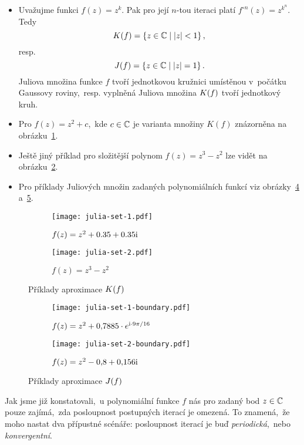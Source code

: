 \begin{example}
    \begin{itemize}
        \item Uvažujme funkci $f(z)=z^k$. Pak pro její $n$-tou iteraci platí $f^{\circ n}(z)=z^{k^n}$. Tedy
        \[K(f)=\left\{z\in\mathbb{C}\mid |z|<1\right\},\]
        resp.
        \[J(f)=\left\{z\in\mathbb{C}\mid|z|=1\right\}.\]
        Juliova množina funkce $f$ tvoří jednotkovou kružnici umístěnou v~počátku Gaussovy roviny,~resp. vyplněná Juliova množina $K(f)$ tvoří jednotkový kruh.
        \item Pro $f(z)=z^2+c$,~kde $c\in\mathbb{C}$ je varianta množiny $K(f)$ znázorněna na obrázku~\ref{subfig:vyplnena-juliova-mnozina-1}.
        \item Ještě jiný příklad pro složitější polynom $f(z)=z^3-z^2$ lze vidět na obrázku~\ref{subfig:vyplnena-juliova-mnozina-2}.
        \item Pro příklady Juliových množin zadaných polynomiálních funkcí viz obrázky~\ref{subfig:juliova-mnozina-1} a~\ref{subfig:juliova-mnozina-2}.
    \end{itemize}
\end{example}
\begin{figure}[h]
    \centering
    \begin{subfigure}{0.45\textwidth}
        \centering
        \texttt{[image: julia-set-1.pdf]}
        \caption{$f(z)=z^2+0.35 + 0.35\textrm{i}$}
        \label{subfig:vyplnena-juliova-mnozina-1}
    \end{subfigure}
    \qquad
    \begin{subfigure}{0.45\textwidth}
        \centering
        \texttt{[image: julia-set-2.pdf]}
        \caption{$f(z)=z^3-z^2$}
        \label{subfig:vyplnena-juliova-mnozina-2}
    \end{subfigure}
    \caption{Příklady aproximace $K(f)$}
    \label{fig:priklady-vyplnenych-juliovych-mnozin}
\end{figure}
\begin{figure}[h]
    \centering
    \begin{subfigure}{0.45\textwidth}
        \centering
        \texttt{[image: julia-set-1-boundary.pdf]}
        \caption{$f(z)=z^2 + 0{,}7885\cdot e^{\textrm{i}\cdot9\pi/16}$}
        \label{subfig:juliova-mnozina-1}
    \end{subfigure}
    \qquad
    \begin{subfigure}{0.45\textwidth}
        \centering
        \texttt{[image: julia-set-2-boundary.pdf]}
        \caption{$f(z)=z^2 - 0{,}8 + 0{,}156\textrm{i}$}
        \label{subfig:juliova-mnozina-2}
    \end{subfigure}
    \caption{Příklady aproximace $J(f)$}
    \label{fig:priklady-juliovych-mnozin}
\end{figure}
Jak jsme již konstatovali,~u polynomiální funkce $f$ nás pro zadaný bod $z\in\mathbb{C}$ pouze zajímá,~zda posloupnost postupných iterací je omezená. To znamená,~že moho nastat dva přípustné scénáře: posloupnost iterací je buď \emph{periodická},~nebo \emph{konvergentní}.

